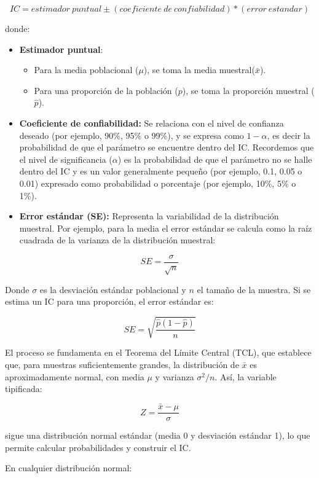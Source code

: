 \documentclass[
  spanish,
  a4paper,
]{scrbook}
\begin{document}
\[ 
IC = estimador~puntual \pm (coeficiente~de~confiabilidad) * (error~ estandar) 
\]

donde:

\begin{itemize}
\item
  \textbf{Estimador puntual}:

  \begin{itemize}
  \item
    Para la media poblacional (\(\mu\)), se toma la media
    muestral(\(\bar{x}\)).
  \item
    Para una proporción de la población (\(p\)), se toma la proporción
    muestral (\(\hat{p}\)).
  \end{itemize}
\item
  \textbf{Coeficiente de confiabilidad:} Se relaciona con el nivel de
  confianza deseado (por ejemplo, 90\%, 95\% o 99\%), y se expresa como
  \(1 - \alpha\), es decir la probabilidad de que el parámetro se
  encuentre dentro del IC. Recordemos que el nivel de significancia
  (\(\alpha\)) es la probabilidad de que el parámetro no se halle dentro
  del IC y es un valor generalmente pequeño (por ejemplo, 0.1, 0.05 o
  0.01) expresado como probabilidad o porcentaje (por ejemplo, 10\%, 5\%
  o 1\%).
\item
  \textbf{Error estándar (SE):} Representa la variabilidad de la
  distribución muestral. Por ejemplo, para la media el error estándar se
  calcula como la raíz cuadrada de la varianza de la distribución
  muestral:
\end{itemize}

\[ 
  SE = \frac{\sigma}{\sqrt{n}} 
\]

Donde \(\sigma\) es la desviación estándar poblacional y \(n\) el tamaño
de la muestra. Si se estima un IC para una proporción, el error estándar
es:

\[ 
  SE = \sqrt{\frac{\hat{p}(1 - \hat{p})}{n}} 
\]

El proceso se fundamenta en el Teorema del Límite Central (TCL), que
establece que, para muestras suficientemente grandes, la distribución de
\(\bar{x}\) es aproximadamente normal, con media \(\mu\) y varianza
\(\sigma^2/n\). Así, la variable tipificada:

\[ 
Z = \frac{\bar{x}-\mu}{\sigma} 
\]

sigue una distribución normal estándar (media 0 y desviación estándar
1), lo que permite calcular probabilidades y construir el IC.

En cualquier distribución normal:
\end{document}
